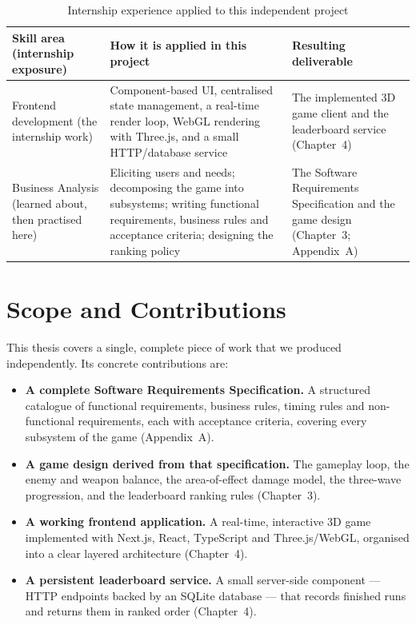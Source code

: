 \begin{table}[h]
\centering
\caption{Internship experience applied to this independent project}
\begin{tabular}{|p{3.6cm}|p{5.0cm}|p{4.0cm}|}
\hline
\textbf{Skill area (internship exposure)} &
\textbf{How it is applied in this project} &
\textbf{Resulting deliverable} \\
\hline
Frontend development \newline (the internship work) &
Component-based UI, centralised state management, a real-time render loop, WebGL
rendering with Three.js, and a small HTTP/database service &
The implemented 3D game client and the leaderboard service (Chapter~4) \\
\hline
Business Analysis \newline (learned about, then practised here) &
Eliciting users and needs; decomposing the game into subsystems; writing
functional requirements, business rules and acceptance criteria; designing the
ranking policy &
The Software Requirements Specification and the game design (Chapter~3;
Appendix~A) \\
\hline
\end{tabular}
\end{table}

\section{Scope and Contributions}

This thesis covers a single, complete piece of work that we produced
independently. Its concrete contributions are:

\begin{itemize}
  \item \textbf{A complete Software Requirements Specification.} A structured
        catalogue of functional requirements, business rules, timing rules and
        non-functional requirements, each with acceptance criteria, covering
        every subsystem of the game (Appendix~A).
  \item \textbf{A game design derived from that specification.} The gameplay
        loop, the enemy and weapon balance, the area-of-effect damage model, the
        three-wave progression, and the leaderboard ranking rules (Chapter~3).
  \item \textbf{A working frontend application.} A real-time, interactive 3D
        game implemented with Next.js, React, TypeScript and Three.js/WebGL,
        organised into a clear layered architecture (Chapter~4).
  \item \textbf{A persistent leaderboard service.} A small server-side component
        --- HTTP endpoints backed by an SQLite database --- that records
        finished runs and returns them in ranked order (Chapter~4).
\end{itemize}

